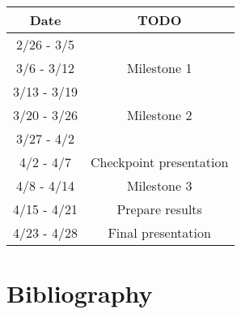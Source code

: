 \documentclass[12pt,letterpaper]{article}
\begin{document}
\begin{center}
\begin{tabular}{ c | c }
\bf{Date} & \bf{TODO} \\ \hline
2/26 - 3/5 &  \\
3/6 - 3/12 &  Milestone 1\\
3/13 - 3/19 &  \\
3/20 - 3/26 &  Milestone 2\\
3/27 - 4/2 &  \\
4/2 - 4/7 & Checkpoint presentation\\
4/8 - 4/14 & Milestone 3\\
4/15 - 4/21 & Prepare results\\
4/23 - 4/28 & Final presentation
\end{tabular}
\end{center}

\section{Bibliography}
\end{document}
